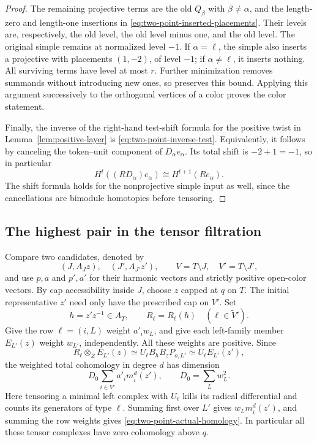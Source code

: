 \begin{proof}
The remaining projective terms are the old \(Q_\beta\) with
\(\beta\ne\alpha\), and the length-zero and length-one insertions
in \eqref{eq:two-point-inserted-placements}.  Their levels are,
respectively, the old level, the old level minus one, and the old
level.  The original simple remains at normalized level \(-1\).
If \(\alpha=\ell\), the simple also inserts a projective with
placements \((1,-2)\), of level \(-1\); if \(\alpha\ne\ell\), it
inserts nothing.  All surviving terms have level at most \(r\).
Further minimization removes summands without introducing new ones,
so preserves this bound.  Applying this argument successively to the
orthogonal vertices of a color proves the color statement.

Finally, the inverse of the right-hand test-shift formula for the
positive twist in Lemma~\ref{lem:positive-layer} is
\eqref{eq:two-point-inverse-test}.  Equivalently, it follows by
canceling the token--unit component of \(D_\alpha e_\alpha\).
Its total shift is \(-2+1=-1\), so in particular
\[
 H^t((R D_\alpha)e_\alpha)
       \cong H^{t+1}(Re_\alpha).
\]
The shift formula holds for the nonprojective simple input as well,
since the cancellations are bimodule homotopies before tensoring.
\end{proof}

\subsection{The highest pair in the tensor filtration}

Compare two candidates, denoted by
\[
 (J,A_Jz),\quad (J',A_{J'}z'),
 \qquad V=T\setminus J,\quad V'=T\setminus J',
\]
and use \(p,a\) and \(p',a'\) for their harmonic vectors and
strictly positive open-color vectors.  By cap accessibility inside
\(J\), choose \(z\) capped at \(q\) on \(T\).  The initial
representative \(z'\) need only have the prescribed cap on \(V'\).
Set
\[
 h=z'z^{-1}\in A_T,
 \qquad R_\ell=R_\ell(h)\quad(\ell\in\widetilde V').
\]
Give the row \(\ell=(i,L)\) weight \(a'_i w_L\), and give each
left-family member \(E_{L'}(z)\) weight \(w_{L'}\), independently.
All these weights are positive.  Since
\[
 R_\ell\otimes_Z E_{L'}(z)
       \simeq U_\ell B_h B_zP_{o,L'}
       \simeq U_\ell E_{L'}(z'),
\]
the weighted total cohomology in degree \(d\) has dimension
\begin{equation}
\label{eq:two-point-actual-homology}
 D_0\sum_{i\in V'}a'_i m_i^d(z'),
 \qquad D_0=\sum_L w_L^2.
\end{equation}
Here tensoring a minimal left complex with \(U_\ell\) kills its
radical differential and counts its generators of type \(\ell\).
Summing first over \(L'\) gives \(w_Lm_i^d(z')\), and summing the
row weights gives \eqref{eq:two-point-actual-homology}.  In particular
all these tensor complexes have zero cohomology above \(q\).


